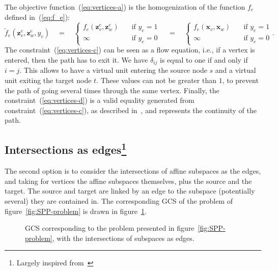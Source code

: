 \documentclass[a4paper, 12pt]{article}
\begin{document}
The objective function~(\ref{eq:vertices-a}) is the homogenization of the function $f_e$ defined in~(\ref{eq:f_e}):
\begin{equation}
    \tilde{f}_e(\mathbf{z}_v^e, \mathbf{z}_w^e, y_e) \quad = \quad \left\{ \begin{split} f_e(\mathbf{z}_v^e, \mathbf{z}_w^e) & \quad \text{if $y_e = 1$} \\ \infty & \quad \text{if $y_e = 0$}\end{split} \right. \quad = \quad \left\{ \begin{split} f_e(\mathbf{x}_v, \mathbf{x}_w) & \quad \text{if $y_e = 1$} \\ \infty & \quad \text{if $y_e = 0$}\end{split} \right. .
\end{equation}
The constraint~(\ref{eq:vertices-c}) can be seen as a flow equation, i.e., if a vertex is entered, then the path has to exit it. We have $\delta_{ij}$ is equal to one if and only if $i = j$. This allows to have a virtual unit entering the source node $s$ and a virtual unit exiting the target node $t$. These values can not be greater than $1$, to prevent the path of going several times through the same vertex. Finally, the constraint~(\ref{eq:vertices-d}) is a valid equality generated from constraint~(\ref{eq:vertices-c}), as described in~\cite[Remark 5.3]{Tobia}, and represents the continuity of the path.

\subsection{Intersections as edges\protect\footnote{Largely inspired from~\cite[Chapter 11.2]{Tobia}}}\label{subsec:edges}
The second option is to consider the intersections of affine subspaces as the edges, and taking for vertices the affine subspaces themselves, plus the source and the target. The source and target are linked by an edge to the subspace (potentially several) they are contained in. The corresponding GCS of the problem of figure~\ref{fig:SPP-problem} is drawn in figure~\ref{fig:edges}.

\begin{figure}[!htb]
    \centering
    \caption{GCS corresponding to the problem presented in figure~\ref{fig:SPP-problem}, with the intersections of subspaces as edges.}\label{fig:edges}
\end{figure}
\end{document}
